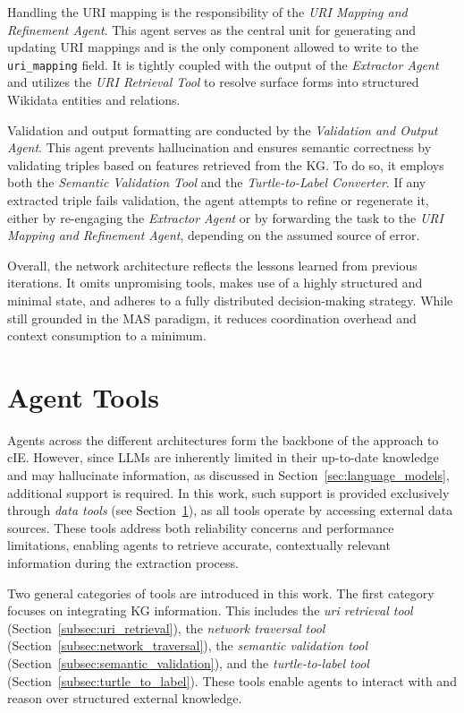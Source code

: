 \documentclass[a4paper,oneside,bibliography=totoc]{scrbook}
\begin{document}
Handling the \ac{URI} mapping is the responsibility of the \textit{\ac{URI} Mapping and Refinement Agent}. This agent serves as the central unit for generating and updating \ac{URI} mappings and is the only component allowed to write to the \texttt{uri\_mapping} field. It is tightly coupled with the output of the \textit{Extractor Agent} and utilizes the \textit{\ac{URI} Retrieval Tool} to resolve surface forms into structured Wikidata entities and relations.

Validation and output formatting are conducted by the \textit{Validation and Output Agent}. This agent prevents hallucination and ensures semantic correctness by validating triples based on features retrieved from the \ac{KG}. To do so, it employs both the \textit{Semantic Validation Tool} and the \textit{Turtle-to-Label Converter}. If any extracted triple fails validation, the agent attempts to refine or regenerate it, either by re-engaging the \textit{Extractor Agent} or by forwarding the task to the \textit{\ac{URI} Mapping and Refinement Agent}, depending on the assumed source of error.

Overall, the network architecture reflects the lessons learned from previous iterations. It omits unpromising tools, makes use of a highly structured and minimal state, and adheres to a fully distributed decision-making strategy. While still grounded in the \ac{MAS} paradigm, it reduces coordination overhead and context consumption to a minimum.

\section{Agent Tools}
\label{sec:agent_tools}

Agents across the different architectures form the backbone of the approach to \ac{cIE}. However, since \acp{LLM} are inherently limited in their up-to-date knowledge and may hallucinate information, as discussed in Section~\ref{sec:language_models}, additional support is required. In this work, such support is provided exclusively through \textit{data tools} (see Section~\ref{sec:agent_tools}), as all tools operate by accessing external data sources. These tools address both reliability concerns and performance limitations, enabling agents to retrieve accurate, contextually relevant information during the extraction process.

Two general categories of tools are introduced in this work. The first category focuses on integrating \ac{KG} information. This includes the \textit{uri retrieval tool} (Section~\ref{subsec:uri_retrieval}), the \textit{network traversal tool} (Section~\ref{subsec:network_traversal}), the \textit{semantic validation tool} (Section~\ref{subsec:semantic_validation}), and the \textit{turtle-to-label tool} (Section~\ref{subsec:turtle_to_label}). These tools enable agents to interact with and reason over structured external knowledge.
\end{document}
